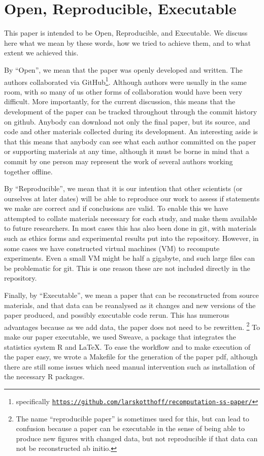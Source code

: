 \section{Open, Reproducible, Executable}

This paper is intended to be Open, Reproducible, and Executable.  We discuss here what we mean by these words, how we tried to achieve them, and to what extent we achieved this.

By ``Open'', we mean that the paper was openly developed and written.  The authors collaborated via GitHub\footnote{specifically
\texttt{\url{https://github.com/larskotthoff/recomputation-ss-paper/}}}.   Although authors were usually in the same room, with so many of us other forms of collaboration would have been very 
difficult.  More importantly, for the current discussion, this means that the development of the paper can be tracked throughout through the commit history on github.  Anybody can download not only the final paper, but its source, and code and other materials collected during its development.  An interesting aside is that this means that anybody can see what each author committed on the paper or supporting materials at any time, although it must be borne in mind that a commit by one person may represent the work of several authors working together offline.

By ``Reproducible'', we mean that it is our intention that other scientists (or ourselves at later dates) will be able to reproduce our work to assess if statements we make are correct and if conclusions are valid.  To enable this we have attempted to collate materials necessary for each study, and make them available to future researchers.  In most cases this has also been done in git, 
with materials such as ethics forms and experimental results put into the repository.  However, in some cases we have constructed virtual machines (VM) to recompute experiments.  Even a small VM 
might be half a gigabyte, and such large files can be problematic for git.  This is one reason these are not included directly in the repository.

Finally, by ``Executable'', we mean a paper that can be reconstructed from source 
materials, and that data can be reanalysed as it changes and new versions of the paper produced, and possibly executable code rerun.  
This has numerous advantages because as we add data, the paper does not need to be rewritten.  
\footnote{The name ``reproducible paper'' is sometimes used for this, but can lead to confusion because a paper can be executable in the sense of being able to produce new figures with 
changed data, but not reproducible if that data can not be reconstructed ab initio.}
To make our paper executable, we used Sweave, a package that integrates the statistics system R and \LaTeX. 
To ease the workflow and to make execution of the paper easy, we wrote a Makefile for the generation of the paper pdf, although there are still some issues which need manual intervention such as installation of the necessary R packages. 

